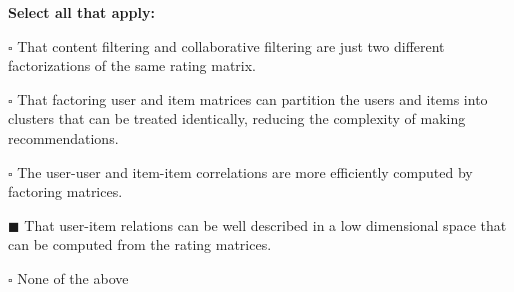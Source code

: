 \documentclass[11pt,addpoints,answers]{exam}
\begin{document}
\begin{questions}
\begin{parts}
    \textbf{Select all that apply:}
    
        \begin{list}{}
        \item $\square$ That content filtering and collaborative filtering are just two different factorizations of the same rating matrix.
        \item $\square$ That factoring user and item matrices can partition the users and items into clusters that can be treated identically, reducing the complexity of making recommendations.
        \item $\square$ The user-user and item-item correlations are more efficiently computed by factoring matrices.
        \item $\blacksquare$ That user-item relations can be well described in a low dimensional space that can be computed from the rating matrices.
        \item $\square$ None of the above
    \end{list}
    
    
    
    \clearpage
    
    \newpage

\end{parts}
\end{questions}
\end{document}
